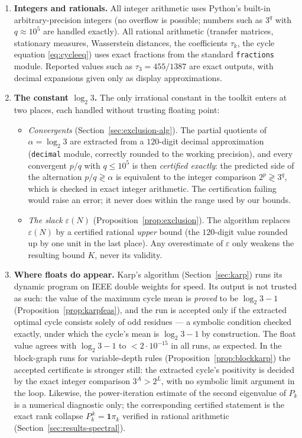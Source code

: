 \documentclass[11pt]{amsart}
\theoremstyle{definition}
\theoremstyle{remark}
\begin{document}
\begin{enumerate}
\item \textbf{Integers and rationals.} All integer arithmetic uses Python's built-in arbitrary-precision integers (no overflow is possible; numbers such as $3^{q}$ with $q \approx 10^5$ are handled exactly). All rational arithmetic (transfer matrices, stationary measures, Wasserstein distances, the coefficients $\tau_k$, the cycle equation \eqref{eq:cycleeq}) uses exact fractions from the standard \texttt{fractions} module. Reported values such as $\tau_3 = 455/1387$ are exact outputs, with decimal expansions given only as display approximations.
\item \textbf{The constant $\log_2 3$.} The only irrational constant in the toolkit enters at two places, each handled without trusting floating point:
  \begin{itemize}
  \item \emph{Convergents} (Section~\ref{sec:exclusion-alg}). The partial quotients of $\alpha = \log_2 3$ are extracted from a $120$-digit decimal approximation (\texttt{decimal} module, correctly rounded to the working precision), and every convergent $p/q$ with $q \le 10^5$ is then \emph{certified exactly}: the predicted side of the alternation $p/q \gtrless \alpha$ is equivalent to the integer comparison $2^p \gtrless 3^q$, which is checked in exact integer arithmetic. The certification failing would raise an error; it never does within the range used by our bounds.
  \item \emph{The slack $\varepsilon(N)$} (Proposition~\ref{prop:exclusion}). The algorithm replaces $\varepsilon(N)$ by a certified rational \emph{upper} bound (the $120$-digit value rounded up by one unit in the last place). Any overestimate of $\varepsilon$ only weakens the resulting bound $K$, never its validity.
  \end{itemize}
\item \textbf{Where floats do appear.} Karp's algorithm (Section~\ref{sec:karp}) runs its dynamic program on IEEE double weights for speed. Its output is not trusted as such: the value of the maximum cycle mean is \emph{proved} to be $\log_2 3 - 1$ (Proposition~\ref{prop:karpfeas}), and the run is accepted only if the extracted optimal cycle consists solely of odd residues --- a symbolic condition checked exactly, under which the cycle's mean is $\log_2 3 - 1$ by construction. The float value agrees with $\log_2 3 - 1$ to $< 2\cdot 10^{-15}$ in all runs, as expected. In the block-graph runs for variable-depth rules (Proposition~\ref{prop:blockkarp}) the accepted certificate is stronger still: the extracted cycle's positivity is decided by the exact integer comparison $3^A > 2^L$, with no symbolic limit argument in the loop. Likewise, the power-iteration estimate of the second eigenvalue of $P_k$ is a numerical diagnostic only; the corresponding certified statement is the exact rank collapse $P_k^{\,k} = \mathbf{1}\pi_k$ verified in rational arithmetic (Section~\ref{sec:results-spectral}).

\end{enumerate}
\end{document}
